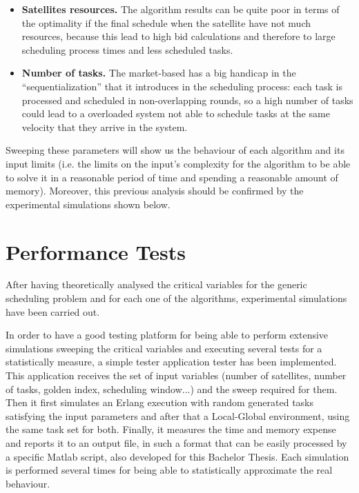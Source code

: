 \begin{itemize}
\item \textbf{Satellites resources. } The algorithm results can be quite poor in terms of the optimality if the final schedule when the satellite have not much resources, because this lead to high bid calculations and therefore to large scheduling process times and less scheduled tasks.

\item \textbf{Number of tasks. } The market-based has a big handicap in the ``sequentialization'' that it introduces in the scheduling process: each task is processed and scheduled in non-overlapping rounds, so a high number of tasks could lead to a overloaded system not able to schedule tasks at the same velocity that they arrive in the system.
\end{itemize}

Sweeping these parameters will show us the behaviour of each algorithm and its input limits (i.e. the limits on the input's complexity for the algorithm to be able to solve it in a reasonable period of time and spending a reasonable amount of memory). Moreover, this previous analysis should be confirmed by the experimental simulations shown below.

\section{Performance Tests}

After having theoretically analysed the critical variables for the generic scheduling problem and for each one of the algorithms, experimental simulations have been carried out.

In order to have a good testing platform for being able to perform extensive simulations sweeping the critical variables and executing several tests for a statistically measure, a simple tester application tester has been implemented. This application receives the set of input variables (number of satellites, number of tasks, golden index, scheduling window...) and the sweep required for them. Then it first simulates an Erlang execution with random generated tasks satisfying the input parameters and after that a Local-Global environment, using the same task set for both. Finally, it measures the time and memory expense and reports it to an output file, in such a format that can be easily processed by a specific Matlab script, also developed for this Bachelor Thesis. Each simulation is performed several times for being able to statistically approximate the real behaviour.

